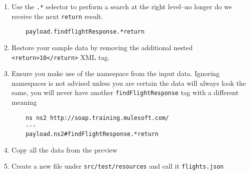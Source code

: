 \begin{enumerate}[resume*]
\item Use the \texttt{.*} selector to perform a search at the right level--no longer do we receive the next \texttt{return} result. 
  \begin{lstlisting}
    payload.findflightResponse.*return
  \end{lstlisting}
\item Restore your sample data by removing the additional nested \texttt{<return>10</return>} XML tag.
\item Ensure you make use of the namespace from the input data.  Ignoring namespaces is not advised unless you are certain the data will always look the same, you will never have another \texttt{findFlightResponse} tag with a different meaning
  \begin{lstlisting}
    ns ns2 http://soap.training.mulesoft.com/
    ---
    payload.ns2#findFlightResponse.*return
  \end{lstlisting}
\item Copy all the data from the preview
\item Create a new file under \texttt{src/test/resources} and call it \texttt{flights.json}
\end{enumerate}

